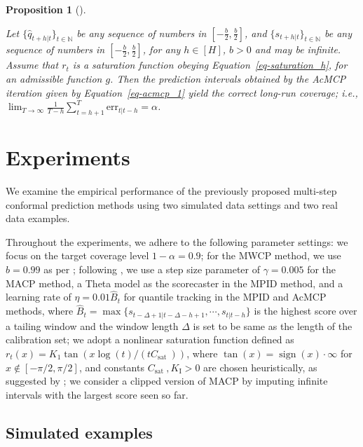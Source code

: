 \documentclass[
  11pt,
  a4paper,
]{article}
\theoremstyle{plain}
\newtheorem{proposition}{Proposition}[section]
\theoremstyle{remark}
\begin{document}
\begin{proposition}[]\protect\hypertarget{prp-cov_acmcp}{}\label{prp-cov_acmcp}

Let \(\{\hat{q}_{t+h|t}\}_{t\in\mathbb{N}}\) be any sequence of numbers
in \([-\frac{b}{2}, \frac{b}{2}]\), and
\(\{s_{t+h|t}\}_{t\in\mathbb{N}}\) be any sequence of numbers in
\([-\frac{b}{2},\frac{b}{2}]\), for any \(h\in[H]\), \(b>0\) and may be
infinite. Assume that \(r_t\) is a saturation function obeying
Equation~\ref{eq-saturation_h}, for an admissible function \(g\). Then
the prediction intervals obtained by the AcMCP iteration given by
Equation~\ref{eq-acmcp_1} yield the correct long-run coverage; i.e.,
\(\lim _{T \rightarrow \infty} \frac{1}{T-h} \sum_{t=h+1}^T \mathrm{err}_{t|t-h} = \alpha\).

\end{proposition}

\section{Experiments}\label{experiments}

We examine the empirical performance of the previously proposed
multi-step conformal prediction methods using two simulated data
settings and two real data examples.

Throughout the experiments, we adhere to the following parameter
settings: we focus on the target coverage level \(1-\alpha=0.9\); for
the MWCP method, we use \(b=0.99\) as per \textcite{barber2023};
following \textcite{angelopoulos2024}, we use a step size parameter of
\(\gamma=0.005\) for the MACP method, a Theta model as the scorecaster
in the MPID method, and a learning rate of \(\eta=0.01\hat{B}_t\) for
quantile tracking in the MPID and AcMCP methods, where
\(\hat{B}_t=\max\{s_{t-\Delta+1|t-\Delta-h+1},\cdots,s_{t|t-h}\}\) is
the highest score over a tailing window and the window length \(\Delta\)
is set to be same as the length of the calibration set; we adopt a
nonlinear saturation function defined as
\(r_t(x)=K_1 \tan \left(x \log (t) / (t C_{\text {sat }})\right)\),
where \(\tan (x)=\operatorname{sign}(x) \cdot \infty\) for
\(x \notin[-\pi / 2, \pi / 2]\), and constants
\(C_{\text {sat }}, K_{\mathrm{I}}>0\) are chosen heuristically, as
suggested by \textcite{angelopoulos2024}; we consider a clipped version
of MACP by imputing infinite intervals with the largest score seen so
far.

\subsection{Simulated examples}\label{simulated-examples}
\end{document}
